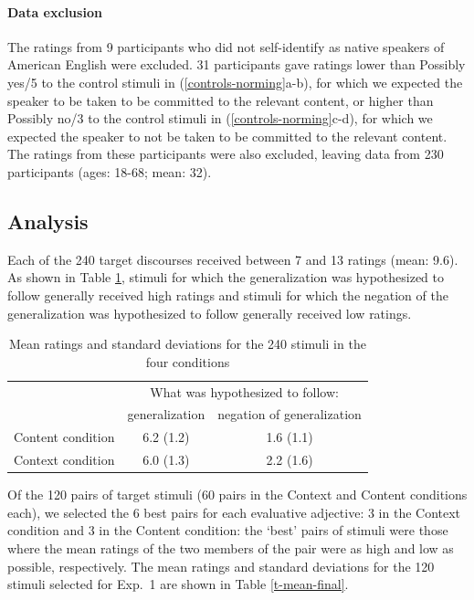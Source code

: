 \documentclass[11pt,fleqn]{article}
\newcommand{\6}{\mbox{$[\hspace*{-.6mm}[$}}
\newcommand{\9}{\mbox{$]\hspace*{-.6mm}]$}}
\begin{document}
\paragraph{Data exclusion} 

The ratings from 9 participants who did not self-identify as native speakers of American English were excluded. 31 participants gave ratings lower than Possibly yes/5 to the control stimuli in (\ref{controls-norming}a-b), for which we expected the speaker to be taken to be committed to the relevant content, or higher than Possibly no/3 to the control stimuli in (\ref{controls-norming}c-d), for which we expected the speaker to not be taken to be committed to the relevant content. The ratings from these participants were also excluded, leaving data from 230 participants (ages: 18-68; mean: 32). 

\subsection{Analysis}

Each of the 240 target discourses received between 7 and 13 ratings (mean: 9.6). As shown in Table \ref{t-mean-norming1}, stimuli for which the generalization was hypothesized to follow generally received high ratings and stimuli for which the negation of the generalization was hypothesized to follow generally received low ratings.

\begin{table}[!h]
\centering

\begin{tabular}{l|cc}
& \multicolumn{2}{c}{What was hypothesized to follow:} \\
& generalization & negation of generalization \\\hline

Content condition &  6.2 (1.2) &  1.6 (1.1) \\
Context condition &  6.0 (1.3) &  2.2 (1.6) \\

\hline
\end{tabular}

\caption{Mean ratings and standard deviations for the 240 stimuli in the four conditions}\label{t-mean-norming1}

\end{table}

Of the 120 pairs of target stimuli (60 pairs in the Context and Content conditions each), we selected the 6 best pairs for each evaluative adjective: 3 in the Context condition and 3 in the Content condition: the `best' pairs of stimuli were those where the mean ratings of the two members of the pair were as high and low as possible, respectively. The mean ratings and standard deviations for the 120 stimuli selected for Exp.~1 are shown in Table \ref{t-mean-final}.
\end{document}
